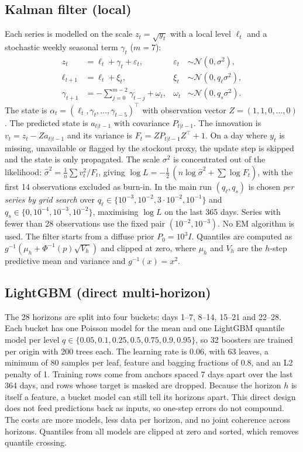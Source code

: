 \documentclass[conference]{IEEEtran}
\begin{document}
\subsection{Kalman filter (local)}
Each series is modelled on the scale $z_t=\sqrt{y_t}$ with a local level $\ell_t$ and a stochastic weekly seasonal term $\gamma_t$ ($m=7$):
\begin{align}
z_t &= \ell_t + \gamma_t + \varepsilon_t, & \varepsilon_t&\sim\mathcal N(0,\sigma^2),\\
\ell_{t+1} &= \ell_t + \xi_t, & \xi_t&\sim\mathcal N(0,q_\ell\sigma^2),\\
\gamma_{t+1} &= -\textstyle\sum_{j=0}^{m-2}\gamma_{t-j} + \omega_t, & \omega_t&\sim\mathcal N(0,q_s\sigma^2).
\end{align}
The state is $\alpha_t=(\ell_t,\gamma_t,\dots,\gamma_{t-5})^\top$ with observation vector $Z=(1,1,0,\dots,0)$. The predicted state is $a_{t|t-1}$ with covariance $P_{t|t-1}$. The innovation is $v_t=z_t-Za_{t|t-1}$ and its variance is $F_t=ZP_{t|t-1}Z^\top+1$. On a day where $y_t$ is missing, unavailable or flagged by the stockout proxy, the update step is skipped and the state is only propagated. The scale $\sigma^2$ is concentrated out of the likelihood: $\hat\sigma^2=\tfrac1n\sum v_t^2/F_t$, giving $\log L=-\tfrac12\,(n\log\hat\sigma^2+\sum\log F_t)$, with the first 14 observations excluded as burn-in. In the main run $(q_\ell,q_s)$ is chosen \emph{per series by grid search} over $q_\ell\in\{10^{-3},10^{-2},3\cdot10^{-2},10^{-1}\}$ and $q_s\in\{0,10^{-4},10^{-3},10^{-2}\}$, maximising $\log L$ on the last 365 days. Series with fewer than 28 observations use the fixed pair $(10^{-2},10^{-3})$. No EM algorithm is used. The filter starts from a diffuse prior $P_0=10^{3}I$. Quantiles are computed as $g^{-1}(\mu_h+\Phi^{-1}(p)\sqrt{V_h})$ and clipped at zero, where $\mu_h$ and $V_h$ are the $h$-step predictive mean and variance and $g^{-1}(x)=x^2$.

\subsection{LightGBM (direct multi-horizon)}
The 28 horizons are split into four buckets: days 1--7, 8--14, 15--21 and 22--28. Each bucket has one Poisson model for the mean and one LightGBM quantile model per level $q\in\{0.05,0.1,0.25,0.5,0.75,0.9,0.95\}$, so 32 boosters are trained per origin with 200 trees each. The learning rate is 0.06, with 63 leaves, a minimum of 80 samples per leaf, feature and bagging fractions of 0.8, and an L2 penalty of 1. Training rows come from anchors spaced 7 days apart over the last 364 days, and rows whose target is masked are dropped. Because the horizon $h$ is itself a feature, a bucket model can still tell its horizons apart. This direct design does not feed predictions back as inputs, so one-step errors do not compound. The costs are more models, less data per horizon, and no joint coherence across horizons. Quantiles from all models are clipped at zero and sorted, which removes quantile crossing.
\end{document}
